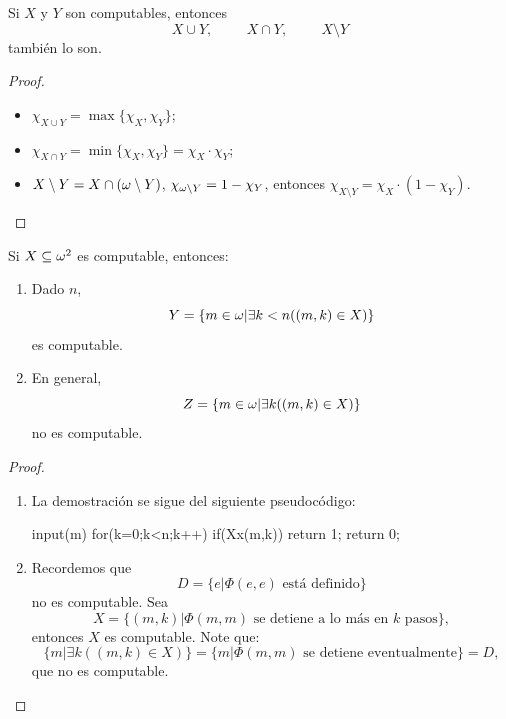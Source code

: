 \begin{prop}
    Si $X$ y $Y$ son computables, entonces
    \[X\cup Y,\hspace{1cm} X\cap Y,\hspace{1cm} X\setminus Y\]
    también lo son.
\end{prop}
\begin{proof}
    \begin{itemize}
        \item $\chi_{X\cup Y}=\max\{\chi_X,\chi_Y\}$;
        \item $\chi_{X\cap Y}=\min\{\chi_X,\chi_Y\}=\chi_X\cdot\chi_Y$;
        \item $X\setminus Y=X\cap(\omega\setminus Y)$, $\chi_{\omega\setminus Y}=1-\chi_Y$, entonces $\chi_{X\setminus Y}=\chi_X\cdot(1-\chi_Y)$.
    \end{itemize}
\end{proof}
\begin{prop}
    Si $X\subseteq\omega^2$ es computable, entonces:
    \begin{enumerate}
        \item Dado $n$,
            \[Y=\{m\in\omega|\exists k<n((m,k)\in X)\}\]
            es computable.
        \item En general, 
            \[Z=\{m\in\omega|\exists k((m,k)\in X)\}\]
            no es computable.
    \end{enumerate}
\end{prop}
\begin{proof} {\hspace{0.5cm}}
    \begin{enumerate} 
        \item La demostración se sigue del siguiente pseudocódigo:
            \begin{center}
            \begin{pseudocodigo}[0.8\textwidth]
                input(m)
                for(k=0;k<n;k++)
                    if(Xx(m,k))
                        return 1;
                return 0;
            \end{pseudocodigo}
            \end{center}
        \item Recordemos que
            \[D=\{e|\Phi(e,e)\text{ está definido}\}\]
            no es computable. Sea 
            \[X=\{(m,k)|\Phi(m,m)\text{ se detiene a lo más en }k\text{ pasos}\},\]
            entonces $X$ es computable. Note que:
            \[\{m|\exists k((m,k)\in X)\}=\{m|\Phi(m,m)\text{ se detiene eventualmente}\}=D,\]
            que no es computable.
    \end{enumerate}
\end{proof}
